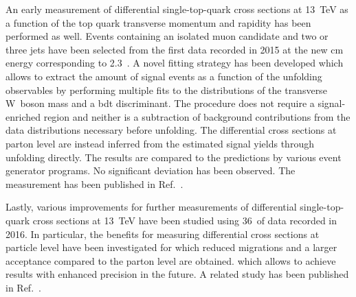 An early measurement of differential single-top-quark cross sections at 13~TeV as a function of the top quark transverse momentum and rapidity has been performed as well. Events containing an isolated muon candidate and two or three jets have been selected from the first data recorded in 2015 at the new \acrlong{cm} energy corresponding to 2.3~\invfb. A novel fitting strategy has been developed which allows to extract the amount of signal events as a function of the unfolding observables by performing multiple fits to the distributions of the transverse W~boson mass and a \gls{bdt} discriminant. The procedure does not require a signal-enriched region and neither is a subtraction of background contributions from the data distributions necessary before unfolding. The differential cross sections at parton level are instead inferred from the estimated signal yields through unfolding directly. The results are compared to the predictions by various event generator programs. No significant deviation has been observed. The measurement has been published in Ref.~\cite{CMS-PAS-TOP-16-004}.

Lastly, various improvements for further measurements of differential single-top-quark cross sections at 13~TeV have been studied using 36~\invfb of data recorded in 2016. In particular, the benefits for measuring differential cross sections at particle level have been investigated for which reduced migrations and a larger acceptance compared to the parton level are obtained. which allows to achieve results with enhanced precision in the future. A related study has been published in Ref.~\cite{particleStudies}.

